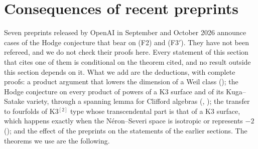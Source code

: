 \section{Consequences of recent preprints}\label{sec:preprints}

Seven preprints released by OpenAI in September and October 2026
\cite{OAI26a,OAI26b,OAI26c,OAI26d,OAI26e,OAI26f,OAI26g} announce cases of the
Hodge conjecture that bear on (F2) and \textup{(F3$'$)}. They have not been
refereed, and we do not check their proofs here. Every statement of this
section that cites one of them is conditional on the theorem cited, and no
result outside this section depends on it. What we add are the deductions,
with complete proofs: a product argument that lowers the dimension of a Weil
class (); the Hodge conjecture on every product of
powers of a K3 surface and of its Kuga--Satake variety, through a spanning
lemma for Clifford algebras (, );
the transfer to fourfolds of K3$^{[2]}$ type whose transcendental part is
that of a K3 surface, which happens exactly when the N\'eron--Severi space
is isotropic or represents $-2$ (); and the effect of the
preprints on the statements of the earlier sections. The theorems we use are
the following.
